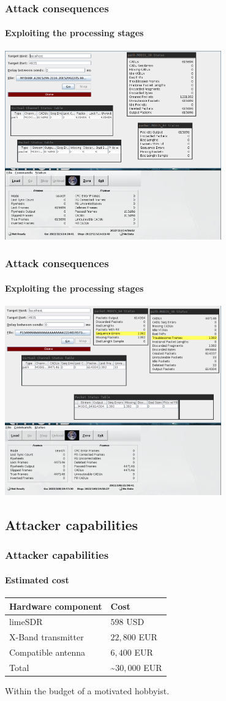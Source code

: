 \documentclass{beamer}
\begin{document}
\begin{frame}
  \frametitle{Attack consequences}
  \framesubtitle{Exploiting the processing stages}
  \centering
  \includegraphics[width=0.7\textwidth]{images/rtstps_correct.png}
\end{frame}

\begin{frame}
  \frametitle{Attack consequences}
  \framesubtitle{Exploiting the processing stages}
  \centering
  \includegraphics[width=0.7\textwidth]{images/rtstps_incorrect.png}
\end{frame}


\subsection{Attacker capabilities}

\begin{frame}
  \frametitle{Attacker capabilities}
  \framesubtitle{Estimated cost}
  \centering
  \begin{tabular}{ l | l }
    \textbf{Hardware component} & \textbf{Cost} \\
    \hline
    limeSDR & $598$ USD \\
    X-Band transmitter & $22,800$ EUR \\
    Compatible antenna & $6,400$ EUR \\
    \hline
    Total & \~{}$30,000$ EUR
  \end{tabular}

  Within the budget of a motivated hobbyist.
\end{frame}
\end{document}
